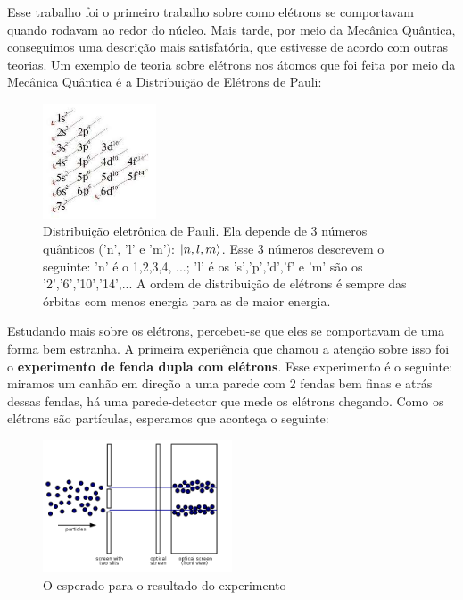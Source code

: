 \documentclass[12pt]{extarticle}
\newcommand{\<}{\langle}
\renewcommand{\>}{\rangle}
\theoremstyle{definition}
\begin{document}
Esse trabalho foi o primeiro trabalho sobre como elétrons se comportavam quando rodavam ao redor do núcleo. Mais tarde, por meio da Mecânica Quântica, conseguimos uma descrição mais satisfatória, que estivesse de acordo com outras teorias. Um exemplo de teoria sobre elétrons nos átomos que foi feita por meio da Mecânica Quântica é a Distribuição de Elétrons de Pauli:
\begin{figure}[H]
    \centering
    \includegraphics[width=0.3\textwidth]{distribuicao_pauli.jpg}
    \caption{Distribuição eletrônica de Pauli. Ela depende de 3 números quânticos ('n', 'l' e 'm'): $\ket{n,l,m}$. Esse 3 números descrevem o seguinte: 'n' é o 1,2,3,4, ...; 'l' é os 's','p','d','f' e 'm' são os '2','6','10','14',... A ordem de distribuição de elétrons é sempre das órbitas com menos energia para as de maior energia.}
    \label{fig:electron_pauli}
\end{figure}

Estudando mais sobre os elétrons, percebeu-se que eles se comportavam de uma forma bem estranha. A primeira experiência que chamou a atenção sobre isso foi o \textbf{experimento de fenda dupla com elétrons}. Esse experimento é o seguinte: miramos um canhão em direção a uma parede com 2 fendas bem finas e atrás dessas fendas, há uma parede-detector que mede os elétrons chegando. Como os elétrons são partículas, esperamos que aconteça o seguinte:
\begin{figure}[H]
    \centering
    \includegraphics[width=0.5\textwidth]{500px-Two-Slit_Experiment_Particles.svg.png}
    \caption{O esperado para o resultado do experimento}
    \label{fig:expected_double_slit}
\end{figure}
\end{document}
